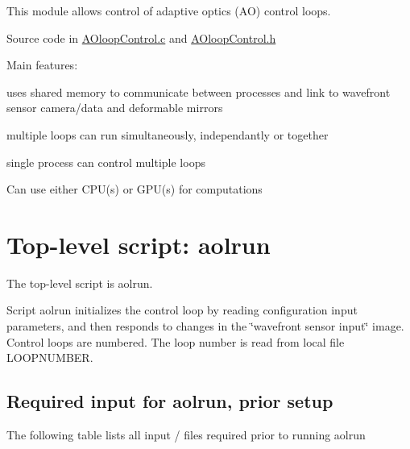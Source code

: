 This module allows control of adaptive optics (A\+O) control loops.

Source code in \hyperlink{AOloopControl_8c}{A\+Oloop\+Control.\+c} and \hyperlink{AOloopControl_8h}{A\+Oloop\+Control.\+h}

Main features\+:
\begin{DoxyItemize}
\item uses shared memory to communicate between processes and link to wavefront sensor camera/data and deformable mirrors
\item multiple loops can run simultaneously, independantly or together
\item single process can control multiple loops
\item Can use either C\+P\+U(s) or G\+P\+U(s) for computations
\end{DoxyItemize}

\section*{Top-\/level script\+: aolrun}

The top-\/level script is aolrun.

Script aolrun initializes the control loop by reading configuration input parameters, and then responds to changes in the \char`\"{}wavefront sensor input\char`\"{} image. Control loops are numbered. The loop number is read from local file L\+O\+O\+P\+N\+U\+M\+B\+E\+R.

\subsection*{Required input for aolrun, prior setup}

The following table lists all input / files required prior to running aolrun

